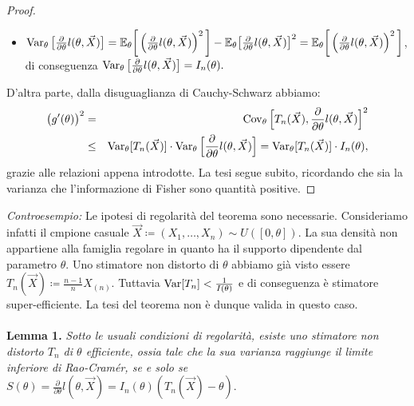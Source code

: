 \begin{proof}
\begin{itemize}
\item $\operatorname{Var}_\theta \big[\frac{\partial}{\partial\theta}l(\theta,\vec{X})\big]= \mathbb{E}_\theta\bigg[\left(\frac{\partial}{\partial\theta}l(\theta,\vec{X})\right)^2\bigg]-\mathbb{E}_\theta\big[\frac{\partial}{\partial\theta}l(\theta,\vec{X})\big]^2=\mathbb{E}_\theta\bigg[\left(\frac{\partial}{\partial\theta}l(\theta,\vec{X})\right)^2\bigg]$, di conseguenza $\operatorname{Var}_\theta \big[\frac{\partial}{\partial\theta}l(\theta,\vec{X})\big]=I_n(\theta).$
\end{itemize}
D'altra parte, dalla disuguaglianza di Cauchy-Schwarz abbiamo:
\begin{eqnarray*}
\big(g'(\theta)\big)^2 &=& \operatorname{Cov}_\theta \Big[T_n(\vec{X}),\frac{\partial}{\partial\theta}l(\theta,\vec{X})\Big]^2\\ &\leq & \operatorname{Var}_\theta[T_n(\vec{X})]\cdot\operatorname{Var}_\theta \Big[\frac{\partial}{\partial\theta}l(\theta,\vec{X})\Big]=\operatorname{Var}_\theta[T_n(\vec{X})]\cdot I_n(\theta),
\end{eqnarray*}
grazie alle relazioni appena introdotte. La tesi segue subito, ricordando che sia la varianza che l'informazione di Fisher sono quantità positive.
\end{proof} 

\textit{Controesempio:} Le ipotesi di regolarità del teorema sono necessarie. Consideriamo infatti il cmpione casuale $\vec{X}\coloneqq (X_1,\ldots,X_n)\sim U([0,\theta])$. La sua densità non appartiene alla famiglia regolare in quanto ha il supporto dipendente dal parametro $\theta$. Uno stimatore non distorto di $\theta$ abbiamo già visto essere $T_n(\vec{X})\coloneqq \frac{n-1}{n}X_{(n)}$. Tuttavia $\operatorname{Var}[T_n]<\frac{1}{I(\theta)}$ e di conseguenza è stimatore super-efficiente. La tesi del teorema non è dunque valida in questo caso.
\\
\\
\textbf{Lemma 1.} \textit{Sotto le usuali condizioni di regolarità, esiste uno stimatore non distorto $T_n$ di $\theta$ efficiente, ossia tale che la sua varianza raggiunge il limite inferiore di Rao-Cramér, se e solo se $S(\theta)=\frac{\partial}{\partial\theta}l(\theta,\vec{X})=I_n(\theta)\left(T_n(\vec{X})-\theta\right)$}.

